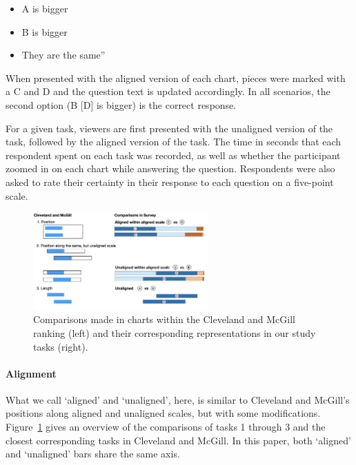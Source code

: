 \documentclass[
]{jds}
\let\oldparagraph\paragraph
\renewcommand{\paragraph}[1]{\oldparagraph{#1}\mbox{}}
\begin{document}
\begin{itemize}
\item
  A is bigger
\item
  B is bigger
\item
  They are the same''
\end{itemize}

When presented with the aligned version of each chart, pieces were
marked with a C and D and the question text is updated accordingly. In
all scenarios, the second option (B {[}D{]} is bigger) is the correct
response.

For a given task, viewers are first presented with the unaligned version
of the task, followed by the aligned version of the task. The time in
seconds that each respondent spent on each task was recorded, as well as
whether the participant zoomed in on each chart while answering the
question. Respondents were also asked to rate their certainty in their
response to each question on a five-point scale.

\begin{figure}[hbt]

{\centering \includegraphics[width=0.6\textwidth,height=\textheight]{images/sketch-tasks.png}

}

\caption{\label{fig-tasks-explain}Comparisons made in charts within the
Cleveland and McGill ranking (left) and their corresponding
representations in our study tasks (right).}

\end{figure}

\hypertarget{alignment}{%
\paragraph{Alignment}\label{alignment}}

What we call `aligned' and `unaligned', here, is similar to Cleveland
and McGill's positions along aligned and unaligned scales, but with some
modifications. Figure~\ref{fig-tasks-explain} gives an overview of the
comparisons of tasks 1 through 3 and the closest corresponding tasks in
Cleveland and McGill. In this paper, both `aligned' and `unaligned' bars
share the same axis.
\end{document}
